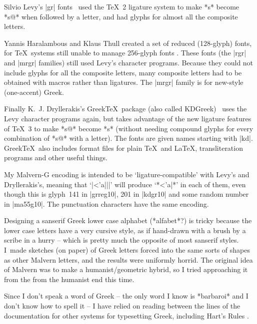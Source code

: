 	Silvio Levy's |gr| fonts \citeLevy\ used the \TeX~2 ligature system
	to make *s* become *s@* when followed by a letter, and had glyphs
	for almost all the composite letters.

	Yannis Haralambous and Klaus Thull created a set of reduced
	(128-glyph) fonts, for \TeX\ systems still unable to manage
	256-glyph fonts \citeYannis.  These fonts (the |rgr| and |mrgr|
	families) still used Levy's character programs.  Because they could
	not include glyphs for all the composite letters, many composite
	letters had to be obtained with macros rather than ligatures.  The
	|mrgr| family is for new-style (one-accent) Greek.

	Finally K.~J. Dryllerakis's Greek\TeX\ package (also called KDGreek)
	\citeKD\ uses the Levy character programs again, but takes advantage
	of the new ligature features of \TeX~3 to make *s@* become *s*
	(without needing compound glyphs for every combination of *s@* with
	a letter).  The fonts are given names starting with |kd|.
	Greek\TeX\ also includes format files for plain \TeX\ and \LaTeX,
	transliteration programs and other useful things.


	My Malvern-G encoding is intended to be `ligature-compatible' with
	Levy's and Dryllerakis's, meaning that `|<'a|||' will produce
	`*<'a|*' in each of them, even though this is glyph~141 in
	|grreg10|, 201 in |kdgr10| and some random number in |ma55g10|.  The
	punctuation characters have the same encoding.

	Designing a sanserif Greek lower case alphabet (*alfabet*?) is tricky
	because the lower case letters have a very cursive style, as if
	hand-drawn with a brush by a scribe in a hurry -- which is pretty
	much the opposite of most sanserif styles.  I~made sketches (on
	paper) of Greek letters forced into the same sorts of shapes as
	other Malvern letters, and the results were uniformly horrid.  The
	original idea of Malvern was to make a humanist/geometric hybrid, so
	I tried approaching it from the from the humanist end this time.

\fi


	Since I don't speak a word of Greek -- the only word I know is
	*barbaroi* and I don't know how to spell it -- I have relied on
	reading between the lines of the documentation for other systems for
	typesetting Greek, including Hart's Rules \citeHarts.

